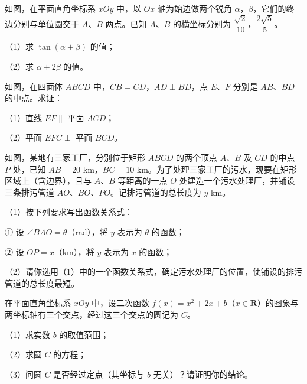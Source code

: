 \Needspace{0.4\textheight}
\begin{question}
如图，在平面直角坐标系 $xOy$ 中，以 $Ox$ 轴为始边做两个锐角 $\alpha$，$\beta$，它们的终边分别与单位圆交于 $A$、$B$ 两点。已知 $A$、$B$ 的横坐标分别为 $\dfrac{\sqrt2}{10}$，$\dfrac{2\sqrt5}5$。

（1）求 $\tan(\alpha+\beta)$ 的值；

（2）求 $\alpha+2\beta$ 的值。
\nopagebreak[4]
\begin{center}\end{center}
\nopagebreak[4]
\Needspace{0.4\textheight}
\end{question}
\begin{question}
如图，在四面体 $ABCD$ 中，$CB=CD$，$AD\perp BD$，点 $E$、$F$ 分别是 $AB$、$BD$ 的中点。求证：

（1）直线 $EF\parallel$ 平面 $ACD$；

（2）平面 $EFC\perp$ 平面 $BCD$。
\nopagebreak[4]
\begin{center}\end{center}
\nopagebreak[4]
\Needspace{0.4\textheight}
\end{question}
\begin{question}
如图，某地有三家工厂，分别位于矩形 $ABCD$ 的两个顶点 $A$、$B$ 及 $CD$ 的中点 $P$ 处，已知 $AB=20$ km，$BC=10$ km。为了处理三家工厂的污水，现要在矩形区域上（含边界），且与 $A$、$B$ 等距离的一点 $O$ 处建造一个污水处理厂，并铺设三条排污管道 $AO$、$BO$、$PO$。记排污管道的总长度为 $y$ km。

（1）按下列要求写出函数关系式：

① 设 $\angle BAO=\theta$（rad），将 $y$ 表示为 $\theta$ 的函数；

② 设 $OP=x$（km），将 $y$ 表示为 $x$ 的函数；

（2）请你选用（1）中的一个函数关系式，确定污水处理厂的位置，使铺设的排污管道的总长度最短。
\nopagebreak[4]
\begin{center}\end{center}
\nopagebreak[4]
\end{question}
\begin{question}
在平面直角坐标系 $xOy$ 中，设二次函数 $f(x)=x^2+2x+b$（$x\in\mathbf R$）的图象与两坐标轴有三个交点，经过这三个交点的圆记为 $C$。

（1）求实数 $b$ 的取值范围；

（2）求圆 $C$ 的方程；

（3）问圆 $C$ 是否经过定点（其坐标与 $b$ 无关）？请证明你的结论。

\end{question}
